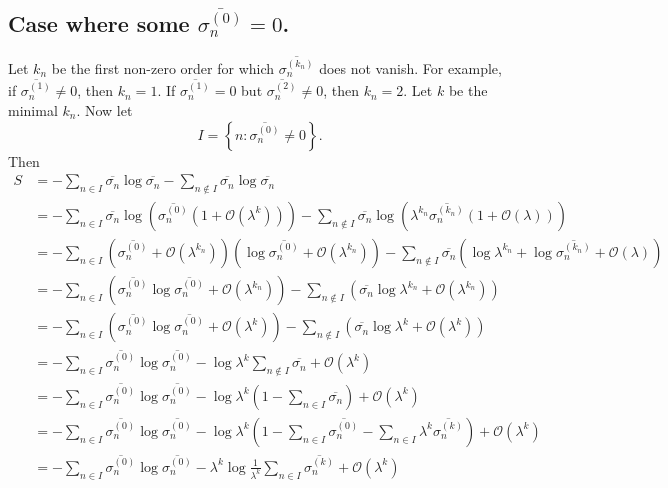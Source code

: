 \documentclass[11pt]{article}
\newcommand{\Od}[1]{\mathcal{O}{\left(#1\right)}}
\theoremstyle{theorem}
\theoremstyle{remark}
\theoremstyle{step}
\theoremstyle{gap}
\begin{document}
\subsection{Case where some \(\overline{\sigma_n^{(0)}} = 0\).}

Let \(k_n\) be the first non-zero order for which \(\overline{\sigma_n^{(k_n)}}\) does not vanish. For example, if \(\overline{\sigma_n^{(1)}} \neq 0\), then \(k_n = 1\). If \(\overline{\sigma_n^{(1)}} = 0\) but \(\overline{\sigma_n^{(2)}} \neq 0\), then \(k_n = 2\). Let \(k\) be the minimal \(k_n\). Now let
\[
I = \left\{n : \overline{\sigma_n^{(0)}} \neq 0\right\}.
\]
Then
\begin{align*}
S &= -\sum_{n \in I} \overline{\sigma_n} \log \overline{\sigma_n}-\sum_{n \not\in I} \overline{\sigma_n} \log \overline{\sigma_n} \\
&= - \sum_{n \in I} \overline{\sigma_n} \log \left(\overline{\sigma_n^{(0)}} \left(1 + \Od{\lambda^{k}}\right)\right)  - \sum_{n \not\in I} \overline{\sigma_n} \log\left(\lambda^{k_n}\overline{\sigma_n^{(k_n)}}\left(1 + \Od{\lambda}\right)\right) \\
&= - \sum_{n \in I} \left(\overline{\sigma_n^{(0)}} + \Od{\lambda^{k_n}}\right) \left(\log \overline{\sigma_n^{(0)}}+\Od{\lambda^{k_n}}\right) - \sum_{n \not\in I} \overline{\sigma_n} \left(\log\lambda^{k_n}+\log\overline{\sigma_n^{(k_n)}}+ \Od{\lambda}\right) \\
&= - \sum_{n \in I} \left(\overline{\sigma_n^{(0)}} \log \overline{\sigma_n^{(0)}} + \Od{\lambda^{k_n}}\right) - \sum_{n \not\in I} \left(\overline{\sigma_n}\log\lambda^{k_n} + \Od{\lambda^{k_n}}\right)\\
&= - \sum_{n \in I} \left(\overline{\sigma_n^{(0)}} \log \overline{\sigma_n^{(0)}} + \Od{\lambda^{k}}\right) - \sum_{n \not\in I} \left(\overline{\sigma_n}\log\lambda^{k} + \Od{\lambda^{k}}\right)\\
&= - \sum_{n \in I} \overline{\sigma_n^{(0)}} \log \overline{\sigma_n^{(0)}} - \log\lambda^{k} \sum_{n \not\in I} \overline{\sigma_n} + \Od{\lambda^{k}}\\
&= - \sum_{n \in I} \overline{\sigma_n^{(0)}} \log \overline{\sigma_n^{(0)}} -\log\lambda^{k} \left(1 - \sum_{n \in I} \overline{\sigma_n}\right) + \Od{\lambda^k} \\
&= - \sum_{n \in I} \overline{\sigma_n^{(0)}} \log \overline{\sigma_n^{(0)}} -\log\lambda^{k} \left(1 - \sum_{n \in I} \overline{\sigma_n^{(0)}} - \sum_{n \in I} \lambda^k \overline{\sigma_n^{(k)}}\right) + \Od{\lambda^k} \\
&= - \sum_{n \in I} \overline{\sigma_n^{(0)}} \log \overline{\sigma_n^{(0)}} -\lambda^k\log\frac{1}{\lambda^{k}} \sum_{n \in I} \overline{\sigma_n^{(k)}} + \Od{\lambda^k}
\end{align*}
\end{document}
